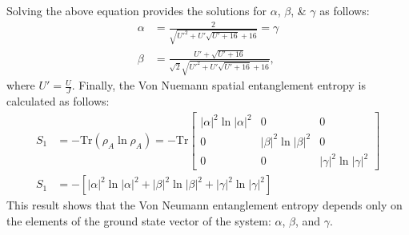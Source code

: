 \noindent Solving the above equation provides the solutions for $\alpha$, $\beta$, \& $\gamma$ as follows:
\begin{align*}
\alpha &= \frac{2}{\sqrt{ U'^2 + U' \sqrt{U' + 16} + 16}} = \gamma \\
\beta &= \frac{U' + \sqrt{U' + 16}}{\sqrt{2}\sqrt{U'^2 + U' \sqrt{U' + 16} + 16}},
\end{align*}
\noindent where $U' = \frac{U}{J}$. Finally, the Von Nuemann spatial entanglement entropy is calculated as follows:
\begin{align}
S_1 &= -\text{Tr} \left( \rho_A \ln{\rho_A} \right) = -\text{Tr} \begin{bmatrix} |\alpha|^2 \ln{|\alpha|^2} & 0 & 0 \\ 0 & |\beta|^2 \ln{|\beta|^2} & 0 \\ 0 & 0 & |\gamma|^2 \ln{|\gamma|^2} \end{bmatrix} \\
S_1 &= -\left[ |\alpha|^2 \ln{|\alpha|^2} + |\beta|^2 \ln{|\beta|^2} + |\gamma|^2 \ln{|\gamma|^2} \right]
\end{align}
\noindent This result shows that the Von Neumann entanglement entropy depends only on the elements of the ground state vector of the system: $\alpha$, $\beta$, and $\gamma$.
